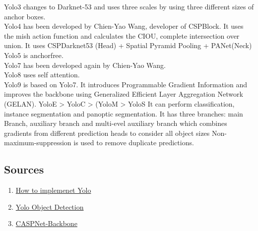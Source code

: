 Yolo3 changes to Darknet-53 and uses three scales by using three different sizes of anchor boxes.\\

Yolo4 has been developed by Chien-Yao Wang, developer of CSPBlock. It uses the mish action function and calculates the CIOU, complete intersection over union. It uses CSPDarknet53 (Head) + Spatial Pyramid Pooling + PANet(Neck)\\

Yolo5 is anchorfree. \\

Yolo7 has been developed again by Chien-Yao Wang. \\

Yolo8 uses self attention.\\

Yolo9 is based on Yolo7. It introduces Programmable Gradient Information and improves the backbone using Generalized Efficient Layer Aggregation Network (GELAN).
YoloE \textgreater{} YoloC \textgreater{} (YoloM \textgreater{} YoloS
It can perform classification, instance segmentation and panoptic segmentation.
It has three branches: main Branch, auxiliary branch and multi-evel auxiliary branch which combines gradients from different prediction heads to consider all object sizes
Non-maximum-suppression is used to remove duplicate predictions.

\subsection{Sources}
\begin{enumerate}
  \item \href{https://blog.paperspace.com/how-to-implement-a-yolo-object-detector-in-pytorch/}{How to implemenet Yolo}
  \item \href{https://www.superannotate.com/blog/yolo-object-detection}{Yolo Object Detection}
  \item \href{https://arxiv.org/pdf/1911.11929.pdf}{CASPNet-Backbone}
\end{enumerate}